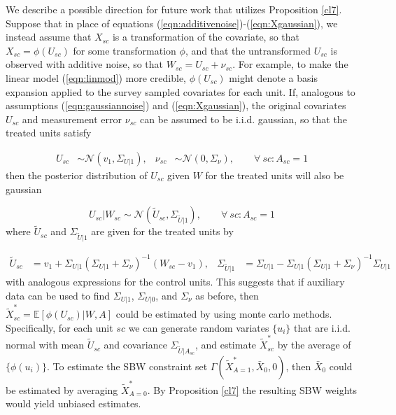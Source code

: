 \begin{remark}\label{remark:basis expansion}
We describe a possible direction for future work that utilizes Proposition \ref{cl7}. Suppose that in place of equations (\ref{eqn:additivenoise})-(\ref{eqn:Xgaussian}), we instead assume that $X_{sc}$ is a transformation of the covariate, so that $X_{sc} = \phi(U_{sc})$ for some transformation $\phi$, and that the untransformed $U_{sc}$ is observed with additive noise, so that $W_{sc} = U_{sc} + \nu_{sc}$. For example, to make the linear model (\ref{eqn:linmod}) more credible, $\phi(U_{sc})$ might denote a basis expansion applied to the survey sampled covariates for each unit. If, analogous to assumptions (\ref{eqn:gaussiannoise}) and (\ref{eqn:Xgaussian}), the original covariates $U_{sc}$ and measurement error $\nu_{sc}$ can be assumed to be i.i.d. gaussian, so that the treated units satisfy

\begin{align*}
    U_{sc} & \sim \mathcal{N}(v_1, \Sigma_{U|1}), & \nu_{sc} & \sim \mathcal{N}(0, \Sigma_{\nu}), \qquad \forall\ sc: A_{sc}=1
\end{align*}
then the posterior distribution of $U_{sc}$ given $W$ for the treated units will also be gaussian

\[ U_{sc}|W_{sc} \sim \mathcal{N}(\tilde{U}_{sc}, \Sigma_{\tilde{U}|1}), \qquad \forall\ sc:A_{sc}=1 \]
where $\tilde{U}_{sc}$ and $\Sigma_{\tilde{U}|1}$ are given for the treated units by

\begin{align*}
\tilde{U}_{sc} &= v_{1} + \Sigma_{U|1} (\Sigma_{U|1} + \Sigma_{\nu})^{-1}(W_{sc} - v_1), & \Sigma_{\tilde{U}|1} & = \Sigma_{U|1} - \Sigma_{U|1} (\Sigma_{U|1} + \Sigma_{\nu})^{-1} \Sigma_{U|1}
\end{align*}
with analogous expressions for the control units. This suggests that if auxiliary data can be used to find $\Sigma_{U|1}$, $\Sigma_{U|0}$, and $\Sigma_{\nu}$ as before, then  $\tilde{X}^*_{sc} = \mathbb{E}[\phi(U_{sc})|W,A]$ could be estimated by using monte carlo methods. Specifically, for each unit $sc$ we can generate random variates $\{u_{i}\}$ that are i.i.d. normal with mean $\tilde{U}_{sc}$ and covariance $\Sigma_{\tilde{U}|A_{sc}}$, and estimate $\tilde{X}_{sc}^*$ by the average of $\{\phi(u_{i})\}$. To estimate the SBW constraint set $\Gamma(\tilde{X}^*_{A=1}, \bar{X}_0, 0)$, then $\bar{X}_0$ could be estimated by averaging $\tilde{X}^*_{A=0}$. By Proposition \ref{cl7} the resulting SBW weights would yield unbiased estimates.
\end{remark}

